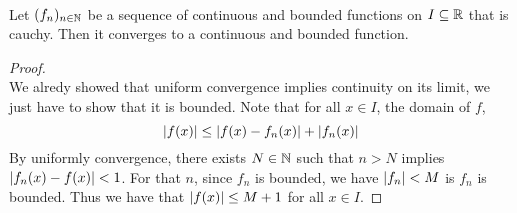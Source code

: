 \documentclass[a4paper]{article}
\begin{document}
\begin{prp}{}{}\\ Let $(f_n)_{n\in\mathbb{N}}$ be a sequence of continuous and bounded functions on $I\subseteq\mathbb{R}$ that is cauchy. Then it converges to a continuous and bounded function. 
\begin{proof}\\ We alredy showed that uniform convergence implies continuity on its limit, we just have to show that it is bounded. Note that for all $x\in I$, the domain of $f$, $$\abs{f(x)}\leq\abs{f(x)-f_n(x)}+\abs{f_n(x)}$$ By uniformly convergence, there exists $N\in\mathbb{N}$ such that $n>N$ implies $\abs{f_n(x)-f(x)}<1$. For that $n$, since $f_n$ is bounded, we have $\abs{f_n}<M$ is $f_n$ is bounded. Thus we have that $\abs{f(x)}\leq M+1$ for all $x\in I$. 
\end{proof}
\end{prp}
\end{document}
